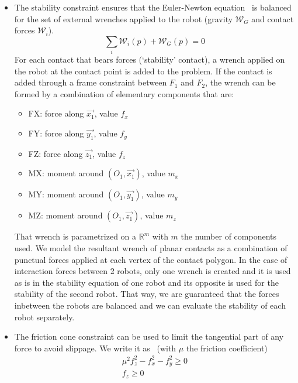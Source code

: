 \begin{itemize}
\item The stability constraint ensures that the Euler-Newton equation~ is balanced for the set of external wrenches applied to the robot (gravity $\mathcal{W}_G$ and contact forces $\mathcal{W}_i$).
\begin{equation}
  \sum_{i}{\mathcal{W}_i(p)} + {\mathcal{W}_G(p)} = 0
  \label{eq:NewtonWrench}
\end{equation}
For each contact that bears forces (`stability' contact), a wrench applied on the robot at the contact point is added to the problem.
If the contact is added through a frame constraint between $F_1$ and $F_2$, the wrench can be formed by a combination of elementary components that are:
\begin{itemize}
\item FX: force along $\vec{x_1}$, value $f_x$
\item FY: force along $\vec{y_1}$, value $f_y$
\item FZ: force along $\vec{z_1}$, value $f_z$
\item MX: moment around $(O_1,\vec{x_1})$, value $m_x$
\item MY: moment around $(O_1,\vec{y_1})$, value $m_y$
\item MZ: moment around $(O_1,\vec{z_1})$, value $m_z$
\end{itemize}
That wrench is parametrized on a $\mathbb{R}^m$ with $m$ the number of components used.
We model the resultant wrench of planar contacts as a combination of punctual forces applied at each vertex of the contact polygon.
In the case of interaction forces between 2 robots, only one wrench is created and it is used as is in the stability equation of one robot and its opposite is used for the stability of the second robot.
That way, we are guaranteed that the forces inbetween the robots are balanced and we can evaluate the stability of each robot separately.

\item The friction cone constraint can be used to limit the tangential part of any force to avoid slippage.
We write it as~ (with $\mu$ the friction coefficient)
\begin{equation}
  \begin{split}
    \mu^2f_z^2-f_x^2-f_y^2 \geq 0 \\
    f_z \geq 0
  \end{split}
  \label{eq:friction}
\end{equation}


\end{itemize}

